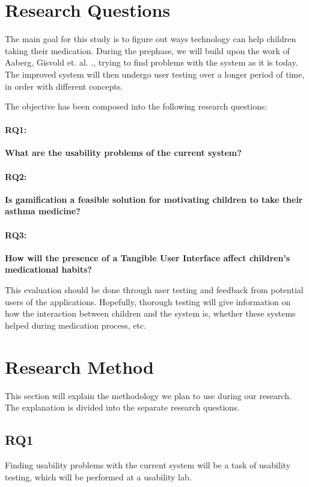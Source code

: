 \section{Research Questions}
\label{sec:researchquestions}
The main goal for this study is to figure out ways technology can help children taking their medication. During the prephase, we will build upon the work of Aaberg, Gisvold et. al.  \cite{CustomerDriven}., trying to find problems with the system as it is today. The improved system will then undergo user testing over a longer period of time, in order with different concepts.


The objective has been composed into the following research questions: 


\paragraph{RQ1:}
\textbf{What are the usability problems of the current system?}


\paragraph{RQ2:}
\textbf{Is gamification a feasible solution for motivating children to take their asthma medicine?}


\paragraph{RQ3:}
\textbf{How will the presence of a Tangible User Interface affect children's medicational habits?}


This evaluation should be done through user testing and feedback from potential users of the applications. Hopefully, thorough testing will give information on how the interaction between children and the system is, whether these systems helped during medication process, etc. 

\section{Research Method}
\label{sec:researchmethod}
This section will explain the methodology we plan to use during our research. The explanation is divided into the separate research questions.  


\subsection{RQ1}
\label{sec:RQ1-methodology}
Finding usability problems with the current system will be a task of usability testing, which will be performed at a usability lab.  


